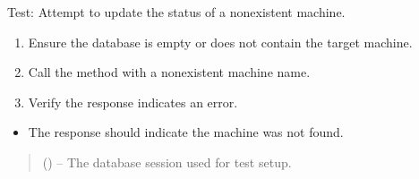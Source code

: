 \documentclass[letterpaper,10pt,english]{sphinxmanual}
\begin{document}
\begin{fulllineitems}
\label{\detokenize{test:test.test_machine.test_update_machine_status_not_found_on}}
\pysigstartsignatures
\pysiglinewithargsret
{}
{}
{}
\pysigstopsignatures
\sphinxAtStartPar
Test: Attempt to update the status of a non\sphinxhyphen{}existent machine.
\begin{description}
\begin{enumerate}
%
\item {} 
\sphinxAtStartPar
Ensure the database is empty or does not contain the target machine.

\item {} 
\sphinxAtStartPar
Call the  method with a non\sphinxhyphen{}existent machine name.

\item {} 
\sphinxAtStartPar
Verify the response indicates an error.

\end{enumerate}

\begin{itemize}
\item {} 
\sphinxAtStartPar
The response should indicate the machine was not found.

\end{itemize}

\end{description}
\begin{quote}\begin{description}
\sphinxAtStartPar
{} () – The database session used for test setup.

\end{description}\end{quote}

\end{fulllineitems}

\end{document}
